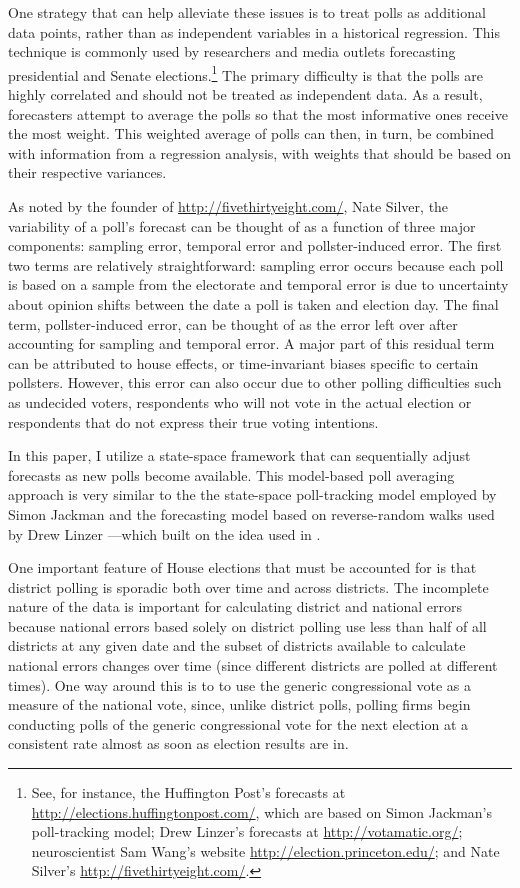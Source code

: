 \documentclass[12pt,final,fleqn]{article}
\theoremstyle{plain}
\begin{document}
One strategy that can help alleviate these issues is to treat polls as additional data points, rather than as independent variables in a historical regression. This technique is commonly used by researchers and media outlets forecasting presidential and Senate elections.\footnote{See, for instance, the Huffington Post's forecasts at \url{http://elections.huffingtonpost.com/}, which are based on Simon Jackman's poll-tracking model; Drew Linzer's forecasts at \url{http://votamatic.org/}; neuroscientist Sam Wang's website \url{http://election.princeton.edu/}; and Nate Silver's \url{http://fivethirtyeight.com/}.} The primary difficulty is that the polls are highly correlated and should not be treated as independent data. As a result, forecasters attempt to average the polls so that the most informative ones receive the most weight. This weighted average of polls can then, in turn, be combined with information from a regression analysis, with weights that should be based on their respective variances.

As noted by the founder of \url{http://fivethirtyeight.com/}, Nate Silver, the variability of a poll's forecast can be thought of as a function of three major components: sampling error, temporal error and pollster-induced error. The first two terms are relatively straightforward: sampling error occurs because each poll is based on a sample from the electorate and temporal error is due to uncertainty about opinion shifts between the date a poll is taken and election day. The final term, pollster-induced error, can be thought of as the error left over after accounting for sampling and temporal error. A major part of this residual term can be attributed to house effects, or time-invariant biases specific to certain pollsters. However, this error can also occur due to other polling difficulties such as undecided voters, respondents who will not vote in the actual election or respondents that do not express their true voting intentions.

In this paper, I utilize a state-space framework that can sequentially adjust forecasts as new polls become available. This model-based poll averaging approach is very similar to the the state-space poll-tracking model employed by Simon Jackman \citep{jackman2005pooling, jackman2009bayesian} and the forecasting model based on reverse-random walks used by Drew Linzer \citep{linzer2013dynamic}---which built on the idea used in \citet{strauss2007florida}. 

One important feature of House elections that must be accounted for is that district polling is sporadic both over time and across districts. The incomplete nature of the data is important for calculating district and national errors because national errors based solely on district polling use less than half of all districts at any given date and the subset of districts available to calculate national errors changes over time (since different districts are polled at different times). One way around this is to to use the generic congressional vote as a measure of the national vote, since, unlike district polls, polling firms begin conducting polls of the generic congressional vote for the next election at a consistent rate almost as soon as election results are in.
\end{document}
